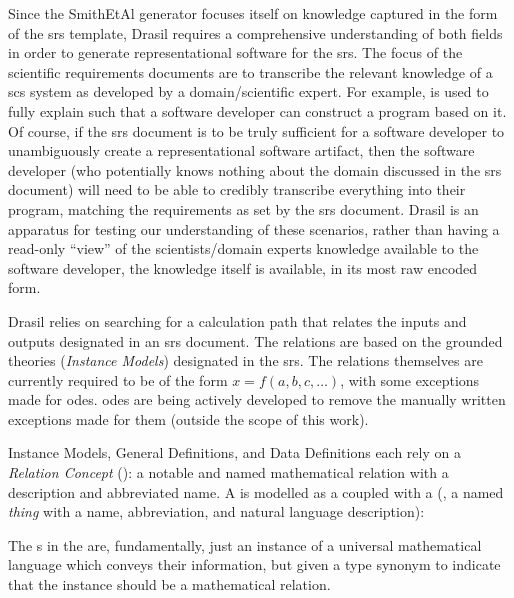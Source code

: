 

Since the SmithEtAl generator focuses itself on knowledge captured in the form
of the \acs{srs} template, Drasil requires a comprehensive understanding of both
fields in order to generate representational software for the \acs{srs}. The
focus of the scientific requirements documents are to transcribe the relevant
knowledge of a \acs{scs} system as developed by a domain/scientific expert. For
example,  is used to fully explain 
such that a software developer can construct a program based on it. Of course,
if the \acs{srs} document is to be truly sufficient for a software developer to
unambiguously create a representational software artifact, then the software
developer (who potentially knows nothing about the domain discussed in the
\acs{srs} document) will need to be able to credibly transcribe everything into
their program, matching the requirements as set by the \acs{srs} document.
Drasil is an apparatus for testing our understanding of these scenarios, rather
than having a read-only ``view'' of the scientists/domain experts knowledge
available to the software developer, the knowledge itself is available, in its
most raw encoded form.

Drasil relies on searching for a calculation path that relates the inputs and
outputs designated in an \acs{srs} document. The relations are based on the
grounded theories (\textit{Instance Models}) designated in the \acs{srs}. The
relations themselves are currently required to be of the form \(x = f(a, b, c,
\ldots{})\), with some exceptions made for \acsp{ode}. \acsp{ode} are being
actively developed to remove the manually written exceptions made for them
(outside the scope of this work).

Instance Models, General Definitions, and Data Definitions each rely on a
\textit{Relation Concept} (\RelationConcept{}): a notable and named mathematical
relation with a description and abbreviated name. A \RelationConcept{} is
modelled as a \Relation{} coupled with a \ConceptChunk{} (, a named \textit{thing} with a name,
abbreviation, and natural language description):

\originalRelationConcept{}

The \Relation{}s  in the \RelationConcept{} are, fundamentally,
just an instance of a universal mathematical language which conveys their
information, but given a type synonym to indicate that the instance should
be a mathematical relation.

